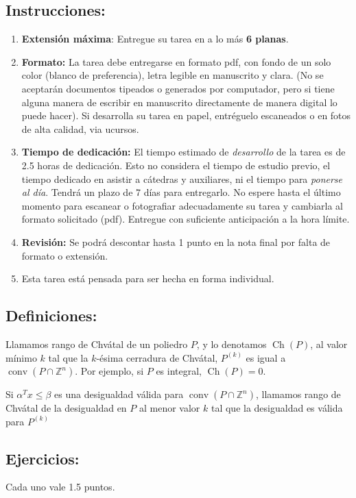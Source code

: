 \documentclass{article}
\newcommand{\ZZ}{\mathbb Z}
\newcommand{\conv}{\operatorname{conv}}
\newcommand{\Ch}{\operatorname{Ch}}
\theoremstyle{plain}
\theoremstyle{definition}
\theoremstyle{Azul}
\begin{document}
\subsection*{Instrucciones:} 
\begin{enumerate}
\item \textbf{Extensión máxima}: Entregue su tarea en a lo más \textbf{6 planas}.
    \item \textbf{Formato:} La tarea debe entregarse en formato pdf, con fondo de un solo color (blanco de preferencia), letra legible en manuscrito y clara. (No se aceptarán documentos tipeados o generados por computador, pero si tiene alguna manera de escribir en manuscrito directamente de manera digital lo puede hacer).
    Si desarrolla su tarea en papel, entréguelo escaneados o en fotos de alta calidad, via ucursos.    \item \textbf{Tiempo de dedicación:} El tiempo estimado de \emph{desarrollo} de la tarea es de 2.5 horas de dedicación. Esto no considera el tiempo de estudio previo, el tiempo dedicado en asistir a cátedras y auxiliares, ni el tiempo para \emph{ponerse al día}. 
     Tendrá un plazo de 7 días para entregarlo. No espere hasta el último momento para escanear o fotografiar adecuadamente su tarea y cambiarla al formato solicitado (pdf). Entregue con suficiente anticipación a la hora límite.
    \item \textbf{Revisión:} Se podrá descontar hasta 1 punto en la nota final por falta de formato o extensión.
\item Esta tarea está pensada para ser hecha en forma individual.
    \end{enumerate}
    
\subsection*{Definiciones:}
Llamamos rango de Chvátal de un poliedro $P$, y lo denotamos $\Ch(P)$, al valor mínimo $k$ tal que la $k$-ésima cerradura de Chvátal,  $P^{(k)}$ es igual a $\conv(P\cap \ZZ^n)$. Por ejemplo, si $P$ es integral, $\Ch(P)=0$.
 
Si $\alpha^Tx\leq \beta$ es una desigualdad válida para $\conv(P\cap \ZZ^n)$, llamamos rango de Chvátal de la desigualdad en $P$ al menor valor $k$ tal que la desigualdad es válida para $P^{(k)}$

\subsection*{Ejercicios:} Cada uno vale 1.5 puntos.
\end{document}

